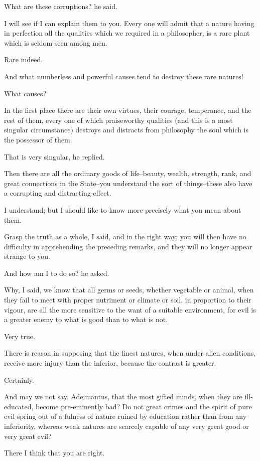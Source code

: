 What are these corruptions? he said.

I will see if I can explain them to you. Every one will admit that a
nature having in perfection all the qualities which we required in a
philosopher, is a rare plant which is seldom seen among men.

Rare indeed.

And what numberless and powerful causes tend to destroy these rare
natures!

What causes?

In the first place there are their own virtues, their courage,
temperance, and the rest of them, every one of which praiseworthy
qualities (and this is a most singular circumstance) destroys and
distracts from philosophy the soul which is the possessor of them.

That is very singular, he replied.

Then there are all the ordinary goods of life--beauty, wealth, strength,
rank, and great connections in the State--you understand the sort of
things--these also have a corrupting and distracting effect.

I understand; but I should like to know more precisely what you mean
about them.

Grasp the truth as a whole, I said, and in the right way; you will then
have no difficulty in apprehending the preceding remarks, and they will
no longer appear strange to you.

And how am I to do so? he asked.

Why, I said, we know that all germs or seeds, whether vegetable or
animal, when they fail to meet with proper nutriment or climate or soil,
in proportion to their vigour, are all the more sensitive to the want of
a suitable environment, for evil is a greater enemy to what is good than
to what is not.

Very true.

There is reason in supposing that the finest natures, when under alien
conditions, receive more injury than the inferior, because the contrast
is greater.

Certainly.

And may we not say, Adeimantus, that the most gifted minds, when they
are ill-educated, become pre-eminently bad? Do not great crimes and
the spirit of pure evil spring out of a fulness of nature ruined by
education rather than from any inferiority, whereas weak natures are
scarcely capable of any very great good or very great evil?

There I think that you are right.

